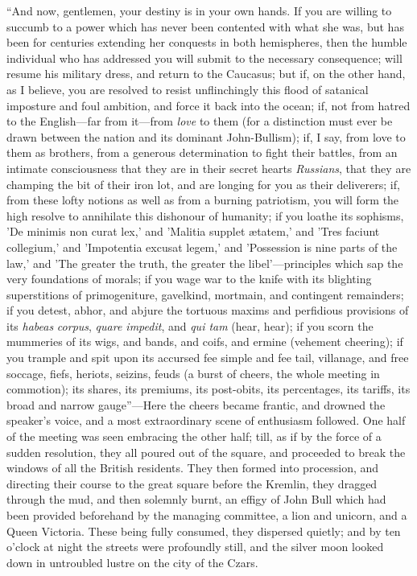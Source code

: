 ``And now, gentlemen, your destiny is in your own
hands. If you are willing to succumb to a power which has
never been contented with what she was, but has been for
centuries extending her conquests in both hemispheres,
then the humble individual who has addressed you will
submit to the necessary consequence; will resume his
military dress, and return to the Caucasus; but if, on
the other hand, as I believe, you are resolved to resist
unflinchingly this flood of satanical imposture and foul
ambition, and force it back into the ocean; if, not from
hatred to the English—far from it—from \emph{love}
to them (for a distinction must ever be drawn between the
nation and its dominant John-Bullism); if, I say, from
love to them as brothers, from a generous determination
to fight their battles, from an intimate consciousness
that they are in their secret hearts \emph{Russians},
that they are champing the bit of their iron lot, and are
longing for you as their deliverers; if, from these lofty
notions as well as from a burning patriotism, you will
form the high resolve to annihilate this dishonour of
humanity; if you loathe its sophisms, 'De minimis non
curat lex,' and 'Malitia supplet ætatem,' and 'Tres
faciunt collegium,' and 'Impotentia excusat legem,' and
'Possession is nine parts of the law,' and 'The greater
the truth, the greater the libel'—principles which
sap the very foundations of morals; if you wage war to
the knife with its blighting superstitions of
primogeniture, gavelkind, mortmain, and contingent
remainders; if you detest, abhor, and abjure the tortuous
maxims and perfidious provisions of its \emph{habeas} \emph{corpus},
\emph{quare impedit}, and \emph{qui tam} (hear,
hear); if you scorn the mummeries of its wigs, and bands,
and coifs, and ermine (vehement cheering); if you trample
and spit upon its accursed fee simple and fee tail,
villanage, and free soccage, fiefs, heriots, seizins,
feuds (a burst of cheers, the whole meeting in
commotion); its shares, its premiums, its post-obits, its
percentages, its tariffs, its broad and narrow
gauge''—Here the cheers became frantic, and
drowned the speaker's voice, and a most extraordinary
scene of enthusiasm followed. One half of the meeting was
seen embracing the other half; till, as if by the force
of a sudden resolution, they all poured out of the
square, and proceeded to break the windows of all the
British residents. They then formed into procession, and
directing their course to the great square before the
Kremlin, they dragged through the mud, and then solemnly
burnt, an effigy of John Bull which had been provided
beforehand by the managing committee, a lion and unicorn,
and a Queen Victoria. These being fully consumed, they
dispersed quietly; and by ten o'clock at night the
streets were profoundly still, and the silver moon looked
down in untroubled lustre on the city of the Czars.


